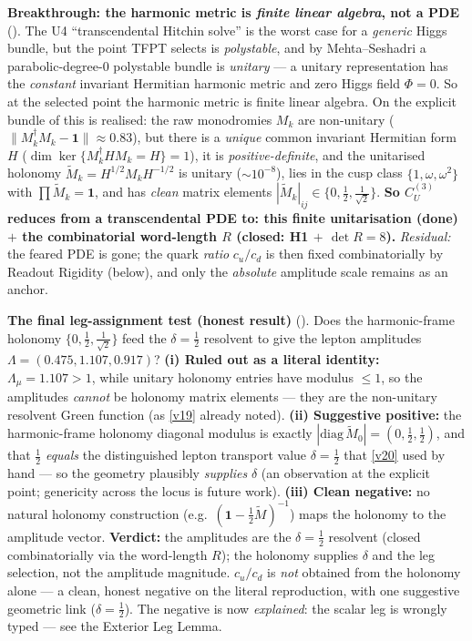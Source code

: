 \par\smallskip\noindent\textbf{Breakthrough: the harmonic metric is \emph{finite linear algebra}, not a PDE} (\mE).
The U4 ``transcendental Hitchin solve'' is the worst case for a \emph{generic} Higgs bundle, but the point
TFPT selects is \emph{polystable}, and by Mehta--Seshadri a parabolic-degree-$0$ polystable bundle is
\emph{unitary} --- a unitary representation has the \emph{constant} invariant Hermitian harmonic metric and
zero Higgs field $\Phi=0$. So at the selected point the harmonic metric is finite linear algebra. On the
explicit bundle of  this is realised: the raw monodromies $M_k$ are
non-unitary ($\|M_k^\dagger M_k-\mathbf1\|\!\approx\!0.83$), but there is a \emph{unique} common invariant
Hermitian form $H$ ($\dim\ker\{M_k^\dagger HM_k=H\}=1$), it is \emph{positive-definite}, and the unitarised
holonomy $\widetilde M_k=H^{1/2}M_kH^{-1/2}$ is unitary ($\sim10^{-8}$), lies in the cusp class
$\{1,\omega,\omega^2\}$ with $\prod\widetilde M_k=\mathbf1$, and has \emph{clean} matrix elements
$|\widetilde M_k|_{ij}\in\{0,\tfrac12,\tfrac1{\sqrt2}\}$. \textbf{So $C_U^{(3)}$ reduces from a transcendental
PDE to: this finite unitarisation (done) $+$ the combinatorial word-length $R$ (closed: H1 $+$ $\det R=8$).}
\emph{Residual:} the feared PDE is gone; the quark \emph{ratio} $c_u/c_d$ is then fixed combinatorially by
Readout Rigidity (below), and only the \emph{absolute} amplitude scale remains as an anchor.


\par\smallskip\noindent\textbf{The final leg-assignment test (honest result)} (\mE).
Does the harmonic-frame holonomy $\{0,\tfrac12,\tfrac1{\sqrt2}\}$ feed the $\delta=\tfrac12$ resolvent to
give the lepton amplitudes $\Lambda=(0.475,1.107,0.917)$? \textbf{(i) Ruled out as a literal identity:}
$\Lambda_\mu=1.107>1$, while unitary holonomy entries have modulus $\le1$, so the amplitudes \emph{cannot}
be holonomy matrix elements --- they are the non-unitary resolvent Green function (as \vref{v19} already noted).
\textbf{(ii) Suggestive positive:} the harmonic-frame holonomy diagonal modulus is exactly
$|\mathrm{diag}\,\widetilde M_0|=(0,\tfrac12,\tfrac12)$, and that $\tfrac12$ \emph{equals} the distinguished
lepton transport value $\delta=\tfrac12$ that \vref{v20} used by hand --- so the geometry plausibly \emph{supplies}
$\delta$ (an observation at the explicit point; genericity across the locus is future work).
\textbf{(iii) Clean negative:} no natural holonomy construction (e.g.\ $(\mathbf1-\tfrac12\widetilde M)^{-1}$)
maps the holonomy to the amplitude vector. \textbf{Verdict:} the amplitudes are the $\delta=\tfrac12$
resolvent (closed combinatorially via the word-length $R$); the holonomy supplies $\delta$ and the leg
selection, not the amplitude magnitude. $c_u/c_d$ is \emph{not} obtained from the holonomy alone --- a clean,
honest negative on the literal reproduction, with one suggestive geometric link ($\delta=\tfrac12$). The
negative is now \emph{explained}: the scalar leg is wrongly typed --- see the Exterior Leg Lemma.


